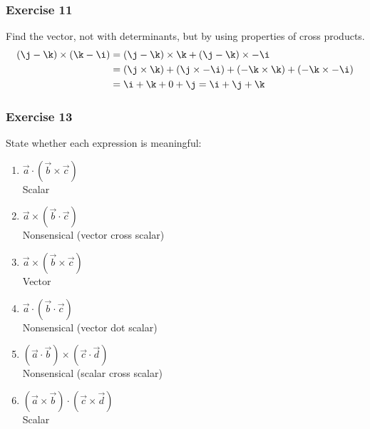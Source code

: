 \documentclass[letterpaper, 12pt]{math}
\begin{document}
\subsubsection*{Exercise 11}
Find the vector, not with determinants, but by using properties of cross
products.
\begin{align*}
  (\j-\k)\times(\k-\i) &= (\j-\k)\times\k+(\j-\k)\times-\i \\
  &= (\j\times\k)+(\j\times-\i)+(-\k\times\k)+(-\k\times-\i) \\
  &= \i+\k+0+\j = \i+\j+\k
\end{align*}

\subsubsection*{Exercise 13}
State whether each expression is meaningful:
\begin{enumerate}
  \item \( \vec{a}\cdot(\vec{b}\times\vec{c}) \) \\
  Scalar
  \item \( \vec{a}\times(\vec{b}\cdot\vec{c}) \) \\
  Nonsensical (vector cross scalar)
  \item \( \vec{a}\times(\vec{b}\times\vec{c}) \) \\
  Vector
  \item \( \vec{a}\cdot(\vec{b}\cdot\vec{c}) \) \\
  Nonsensical (vector dot scalar)
  \item \( (\vec{a}\cdot\vec{b})\times(\vec{c}\cdot\vec{d}) \) \\
  Nonsensical (scalar cross scalar)
  \item \( (\vec{a}\times\vec{b})\cdot(\vec{c}\times\vec{d}) \) \\
  Scalar
\end{enumerate}
\end{document}
